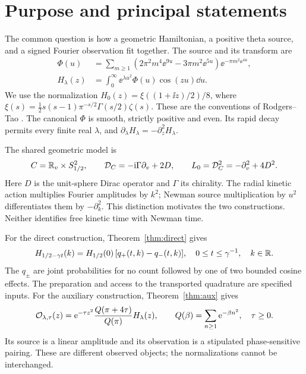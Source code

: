 \section{Purpose and principal statements}\label{sec:intro}

The common question is how a geometric Hamiltonian, a positive theta
source, and a signed Fourier observation fit together. The source and its
transform are
\begin{align}
 \Phi(u)&=\sum_{m\ge1}
 (2\pi^2m^4\ee^{9u}-3\pi m^2\ee^{5u})\ee^{-\pi m^2\ee^{4u}},\label{eq:source}\\
 H_\lambda(z)&=\int_0^\infty\ee^{\lambda u^2}\Phi(u)\cos(zu)\dd u.
 \label{eq:Hintro}
\end{align}
We use the normalization
$H_0(z)=\xi((1+\ii z)/2)/8$, where
$\xi(s)=\tfrac12s(s-1)\pi^{-s/2}\Gamma(s/2)\zeta(s)$.
These are the conventions of Rodgers--Tao
\cite[Introduction, (1)--(4)]{RodgersTao2020}.
The canonical $\Phi$ is smooth, strictly positive and even. Its rapid
decay permits every finite real $\lambda$, and
$\partial_\lambda H_\lambda=-\partial_z^2H_\lambda$.

The shared geometric model is
\begin{equation}\label{eq:modelintro}
 C=\mathbb R_v\times S^2_{1/2},\qquad
 \mathcal D_C=-\mathrm i\Gamma\partial_v+2D,\qquad
 L_0=\mathcal D_C^2=-\partial_v^2+4D^2.
\end{equation}
Here $D$ is the unit-sphere Dirac operator and $\Gamma$ its chirality.
The radial kinetic action multiplies Fourier amplitudes by $k^2$;
Newman source multiplication by $u^2$ differentiates them by
$-\partial_k^2$. This distinction motivates the two constructions.
Neither identifies free kinetic time with Newman time.

For the direct construction, Theorem~\ref{thm:direct} gives
\begin{equation}\label{eq:directintro}
 H_{1/2-\gamma t}(k)=H_{1/2}(0)\,[q_+(t,k)-q_-(t,k)],
 \quad 0\le t\le\gamma^{-1},\quad k\in\mathbb R.
\end{equation}
The $q_\pm$ are joint probabilities for no count followed by one of two
bounded cosine effects. The preparation and access to the transported
quadrature are specified inputs. For the auxiliary construction,
Theorem~\ref{thm:aux} gives
\begin{equation}\label{eq:auxintro}
 \mathcal O_{\lambda,\tau}(z)
 =\mathrm e^{-\tau z^2}\frac{Q(\pi+4\tau)}{Q(\pi)}H_\lambda(z),
 \qquad Q(\beta)=\sum_{n\ge1}\mathrm e^{-\beta n^2},\quad\tau\ge0.
\end{equation}
Its source is a linear amplitude and its observation is a stipulated
phase-sensitive pairing. These are different observed objects; the
normalizations cannot be interchanged.

